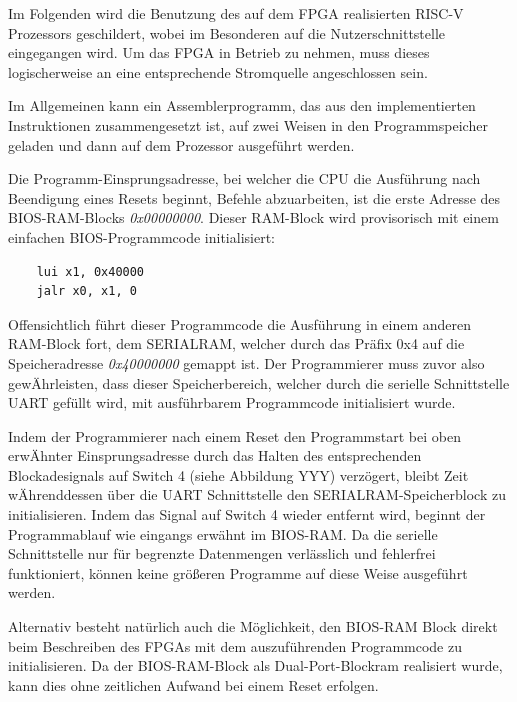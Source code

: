 
Im Folgenden wird die Benutzung des auf dem FPGA realisierten RISC-V Prozessors geschildert, wobei im Besonderen auf die Nutzerschnittstelle eingegangen wird. Um das FPGA in Betrieb zu nehmen, muss dieses logischerweise an eine entsprechende Stromquelle angeschlossen sein.


Im Allgemeinen kann ein Assemblerprogramm, das aus den implementierten Instruktionen zusammengesetzt ist, auf zwei Weisen in den Programmspeicher geladen und dann auf dem Prozessor ausgef\"uhrt werden.


Die Programm-Einsprungsadresse, bei welcher die CPU die Ausf\"uhrung nach Beendigung eines Resets beginnt, Befehle abzuarbeiten, ist die erste Adresse des BIOS-RAM-Blocks \textit{0x00000000}. Dieser RAM-Block wird provisorisch mit einem einfachen BIOS-Programmcode initialisiert:


\begin{lstlisting}
	lui x1, 0x40000
	jalr x0, x1, 0
\end{lstlisting}


Offensichtlich f\"uhrt dieser Programmcode die Ausf\"uhrung in einem anderen RAM-Block fort, dem SERIALRAM, welcher durch das Pr\"afix 0x4 auf die Speicheradresse \textit{0x40000000} gemappt ist. Der Programmierer muss zuvor also gew\"Ahrleisten, dass dieser Speicherbereich, welcher durch die serielle Schnittstelle UART gef\"ullt wird, mit ausf\"uhrbarem Programmcode initialisiert wurde.

Indem der Programmierer nach einem Reset den Programmstart bei oben erw\"Ahnter Einsprungsadresse durch das Halten des entsprechenden Blockadesignals auf Switch 4 (siehe Abbildung YYY) verz\"ogert, bleibt Zeit w\"Ahrenddessen \"uber die UART Schnittstelle den SERIALRAM-Speicherblock zu initialisieren. Indem das Signal auf Switch 4 wieder entfernt wird, beginnt der Programmablauf wie eingangs erw\"ahnt im BIOS-RAM.
Da die serielle Schnittstelle nur f\"ur begrenzte Datenmengen verl\"asslich und fehlerfrei funktioniert, k\"onnen keine gr\"oßeren Programme auf diese Weise ausgef\"uhrt werden.


Alternativ besteht nat\"urlich auch die M\"oglichkeit, den BIOS-RAM Block direkt beim Beschreiben des FPGAs mit dem auszuf\"uhrenden Programmcode zu initialisieren. Da der BIOS-RAM-Block als Dual-Port-Blockram realisiert wurde, kann dies ohne zeitlichen Aufwand bei einem Reset erfolgen.

